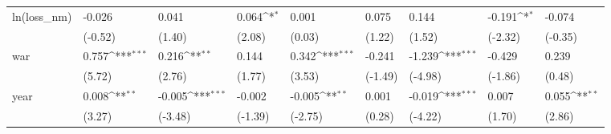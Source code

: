 \def\sym#1{\ifmmode^{#1}\else\(^{#1}\)\fi}
\begin{tabular}{p{1.5cm} p{2cm} p{1.7cm} p{1.7cm} p{1.7cm} p{1.7cm} p{1.7cm} p{1.7cm} p{1.7cm}}
\hline
ln(loss\_nm)     &   -0.026         &    0.041         &    0.064\sym{*}  &    0.001         &    0.075         &    0.144         &   -0.191\sym{*}  &   -0.074         \\
                &  (-0.52)         &   (1.40)         &   (2.08)         &   (0.03)         &   (1.22)         &   (1.52)         &  (-2.32)         &  (-0.35)         \\
war             &    0.757\sym{***}&    0.216\sym{**} &    0.144         &    0.342\sym{***}&   -0.241         &   -1.239\sym{***}&   -0.429         &    0.239         \\
                &   (5.72)         &   (2.76)         &   (1.77)         &   (3.53)         &  (-1.49)         &  (-4.98)         &  (-1.86)         &   (0.48)         \\
year            &    0.008\sym{**} &   -0.005\sym{***}&   -0.002         &   -0.005\sym{**} &    0.001         &   -0.019\sym{***}&    0.007         &    0.055\sym{**} \\
                &   (3.27)         &  (-3.48)         &  (-1.39)         &  (-2.75)         &   (0.28)         &  (-4.22)         &   (1.70)         &   (2.86)         \\
\end{tabular}
